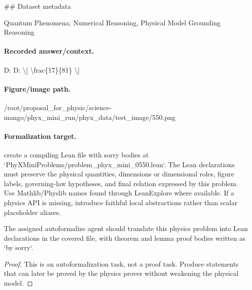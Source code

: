 \#\# Dataset metadata

Quantum Phenomena; Numerical Reasoning, Physical Model Grounding Reasoning

\paragraph{Recorded answer/context.}
D: D: \textbackslash{}[ \textbackslash{}frac\{17\}\{81\} \textbackslash{}]

\paragraph{Figure/image path.}
/root/proposal\_for\_physic/science-mango/phyx\_mini\_run/phyx\_data/test\_image/550.png

\paragraph{Formalization target.}
create a compiling Lean file with sorry bodies at `PhyXMiniProblems/problem\_phyx\_mini\_0550.lean`. The Lean declarations must preserve the physical quantities, dimensions or dimensional roles, figure labels, governing-law hypotheses, and final relation expressed by this problem.
Use Mathlib/Physlib names found through LeanExplore where available. If a physics API is missing, introduce faithful local abstractions rather than scalar placeholder aliases.

\begin{theorem}
\label{thm:physics:phyx_mini_0550:target}
The assigned autoformalize agent should translate this physics problem into Lean declarations in the covered file, with theorem and lemma proof bodies written as `by sorry`.
\end{theorem}
\begin{proof}
This is an autoformalization task, not a proof task. Produce statements that can later be proved by the physics prover without weakening the physical model.
\end{proof}

